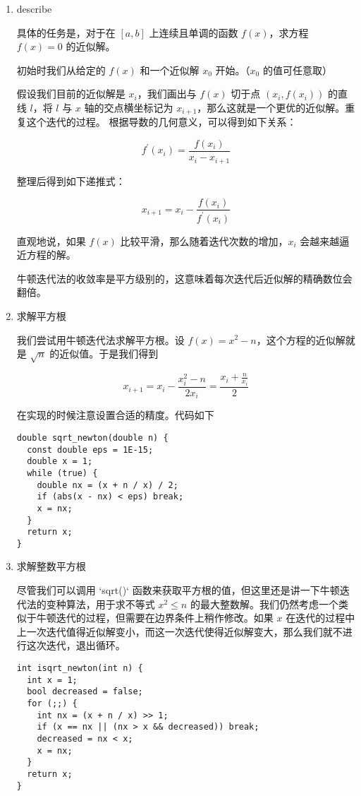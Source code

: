 \begin{enumerate}

\item describe

具体的任务是，对于在 $[a,b]$ 上连续且单调的函数 $f(x)$，求方程 $f(x)=0$ 的近似解。

初始时我们从给定的 $f(x)$ 和一个近似解 $x_0$ 开始。（$x_0$ 的值可任意取）

假设我们目前的近似解是 $x_i$，我们画出与 $f(x)$ 切于点 $(x_i,f(x_i))$ 的直线 $l$，将 $l$ 与 $x$ 轴的交点横坐标记为 $x_{i+1}$，那么这就是一个更优的近似解。重复这个迭代的过程。
根据导数的几何意义，可以得到如下关系：

$$
 f^\prime(x_i) = \frac{f(x_i)}{x_{i} - x_{i+1}}
$$

整理后得到如下递推式：

$$
 x_{i+1} = x_i - \frac{f(x_i)}{f^\prime(x_i)}
$$

直观地说，如果 $f(x)$ 比较平滑，那么随着迭代次数的增加，$x_i$ 会越来越逼近方程的解。

牛顿迭代法的收敛率是平方级别的，这意味着每次迭代后近似解的精确数位会翻倍。

\item 求解平方根

我们尝试用牛顿迭代法求解平方根。设 $f(x)=x^2-n$，这个方程的近似解就是 $\sqrt{n}$ 的近似值。于是我们得到

$$
x_{i+1}=x_i-\frac{x_i^2-n}{2x_i}=\frac{x_i+\frac{n}{x_i}}{2}
$$

在实现的时候注意设置合适的精度。代码如下

\begin{lstlisting}
double sqrt_newton(double n) {
  const double eps = 1E-15;
  double x = 1;
  while (true) {
    double nx = (x + n / x) / 2;
    if (abs(x - nx) < eps) break;
    x = nx;
  }
  return x;
}
\end{lstlisting}

\item 求解整数平方根

尽管我们可以调用 `sqrt()` 函数来获取平方根的值，但这里还是讲一下牛顿迭代法的变种算法，用于求不等式 $x^2\le n$ 的最大整数解。我们仍然考虑一个类似于牛顿迭代的过程，但需要在边界条件上稍作修改。如果 $x$ 在迭代的过程中上一次迭代值得近似解变小，而这一次迭代使得近似解变大，那么我们就不进行这次迭代，退出循环。

\begin{lstlisting}
int isqrt_newton(int n) {
  int x = 1;
  bool decreased = false;
  for (;;) {
    int nx = (x + n / x) >> 1;
    if (x == nx || (nx > x && decreased)) break;
    decreased = nx < x;
    x = nx;
  }
  return x;
}
\end{lstlisting}


\end{enumerate}
